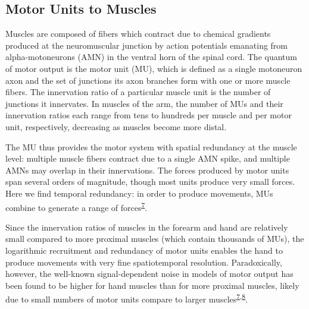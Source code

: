 \documentclass[
  a4paper,
]{article}
\begin{document}
\hypertarget{motor-units-to-muscles}{%
\subsection{Motor Units to Muscles}\label{motor-units-to-muscles}}

Muscles are composed of fibers which contract due to chemical gradients
produced at the neuromuscular junction by action potentials emanating
from alpha-motoneurons (AMN) in the ventral horn of the spinal cord. The
quantum of motor output is the motor unit (MU), which is defined as a
single motoneuron axon and the set of junctions its axon branches form
with one or more muscle fibers. The innervation ratio of a particular
muscle unit is the number of junctions it innervates. In muscles of the
arm, the number of MUs and their innervation ratios each range from tens
to hundreds per muscle and per motor unit, respectively, decreasing as
muscles become more distal.

The MU thus provides the motor system with spatial redundancy at the
muscle level: multiple muscle fibers contract due to a single AMN spike,
and multiple AMNs may overlap in their innervations. The forces produced
by motor units span several orders of magnitude, though most units
produce very small forces. Here we find temporal redundancy: in order to
produce movements, MUs combine to generate a range of
forces\textsuperscript{\protect\hyperlink{ref-fuglevandMechanicalPropertiesNeural2011}{7}}.

Since the innervation ratios of muscles in the forearm and hand are
relatively small compared to more proximal muscles (which contain
thousands of MUs), the logarithmic recruitment and redundancy of motor
units enables the hand to produce movements with very fine
spatiotemporal resolution. Paradoxically, however, the well-known
signal-dependent noise in models of motor output has been found to be
higher for hand muscles than for more proximal muscles, likely due to
small numbers of motor units compare to larger
muscles\textsuperscript{\protect\hyperlink{ref-fuglevandMechanicalPropertiesNeural2011}{7},\protect\hyperlink{ref-harrisSignaldependentNoiseDetermines1998}{8}}.
\end{document}

